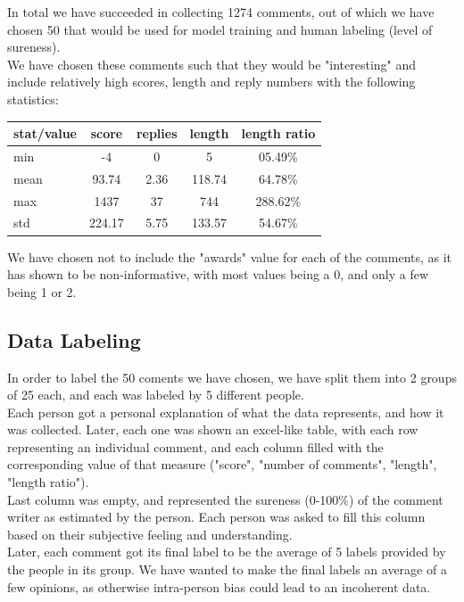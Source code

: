 \documentclass[11pt, oneside]{article}   	%
\begin{document}
In total we have succeeded in collecting 1274 comments, out of which we have chosen 50 that would be used for model training and human labeling (level of sureness).\\
We have chosen these comments such that they would be "interesting" and include relatively high scores, length and reply numbers with the following statistics:\\
\begin{center}
	\begin{tabular}{|l|c|c|c|c|}
		\hline
		stat/value & score & replies & length & length ratio\\
		\hline
		min & -4 & 0 & 5 & 05.49\% \\
		mean & 93.74 & 2.36 & 118.74 & 64.78\% \\
		max & 1437 & 37 & 744 & 288.62\% \\
		std & 224.17 & 5.75 & 133.57 & 54.67\%\\
		\hline
	\end{tabular}
\end{center}

We have chosen not to include the "awards" value for each of the comments, as it has shown to be non-informative, with most values being a 0, and only a few being 1 or 2.\\

\subsection{Data Labeling}
In order to label the 50 coments we have chosen, we have split them into 2 groups of 25 each, and each was labeled by 5 different people.\\

Each person got a personal explanation of what the data represents, and how it was collected. Later, each one was shown an excel-like table, with each row representing an individual comment, and each column filled with the corresponding value of that measure ("score", "number of comments", "length", "length ratio").\\
Last column was empty, and represented the sureness (0-100\%) of the comment writer as estimated by the person. Each person was asked to fill this column based on their subjective feeling and understanding.\\

Later, each comment got its final label to be the average of 5 labels provided by the people in its group.
We have wanted to make the final labels an average of a few opinions, as otherwise intra-person bias could lead to an incoherent data.\\
\end{document}
